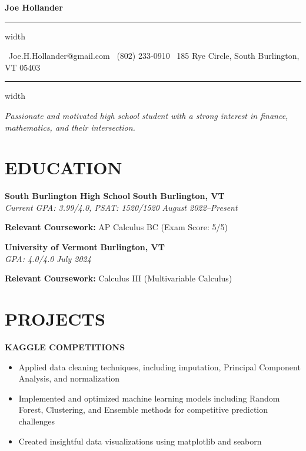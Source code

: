 \documentclass[10pt,letterpaper]{article}
\newcommand{\name}[1]{
  \begin{center}
    \Huge\textbf{\color{headingcolor}#1}
  \end{center}
  \vspace{-0.5em}
  \hrule height 0.8pt width \textwidth
  \vspace{0.5em}
}
\newcommand{\contact}[3]{
  \begin{center}
    \faEnvelope\ #1 \hspace{1em} \faPhone\ #2 \hspace{1em} \faMapMarker*\ #3
  \end{center}
  \vspace{-0.5em}
  \hrule height 0.4pt width \textwidth
  \vspace{0.5em}
}
\newcommand{\role}[4]{
  \textbf{\color{subheadingcolor}#1} \hfill \textbf{#2} \\
  \textit{#3} \hfill \textit{#4}
}
\begin{document}
\name{Joe Hollander}
\vspace{-0.25em}
\contact{Joe.H.Hollander@gmail.com}{(802) 233-0910}{185 Rye Circle, South Burlington, VT 05403}

\vspace{-0.25em}
\begin{center}
\textit{Passionate and motivated high school student with a strong interest in finance, mathematics, and their intersection.}
\end{center}

\section{EDUCATION}

\vspace{0.5em}
\role{South Burlington High School}{South Burlington, VT}{Current GPA: 3.99/4.0, PSAT: 1520/1520}{August 2022--Present}   
\begin{flushleft}
\textbf{Relevant Coursework:} AP Calculus BC (Exam Score: 5/5)\\
\end{flushleft}

\vspace{0.5em}
\begin{flushleft}
\textbf{\color{subheadingcolor}University of Vermont} \hfill \textbf{Burlington, VT} \\
\textit{GPA: 4.0/4.0} \hfill \textit{July 2024}
\end{flushleft}
\begin{flushleft}
\textbf{Relevant Coursework:} Calculus III (Multivariable Calculus)\\
\end{flushleft}

\vspace{0.5em}
\section{PROJECTS}
\vspace{0.5em}

\begin{flushleft}
\textbf{\color{subheadingcolor}KAGGLE COMPETITIONS}
\begin{itemize}[leftmargin=*,nosep,itemsep=2pt]
    \item Applied data cleaning techniques, including imputation, Principal Component Analysis, and normalization
    \item Implemented and optimized machine learning models including Random Forest, Clustering, and Ensemble methods for competitive prediction challenges
    \item Created insightful data visualizations using matplotlib and seaborn
\end{itemize}
\end{flushleft}
\end{document}
